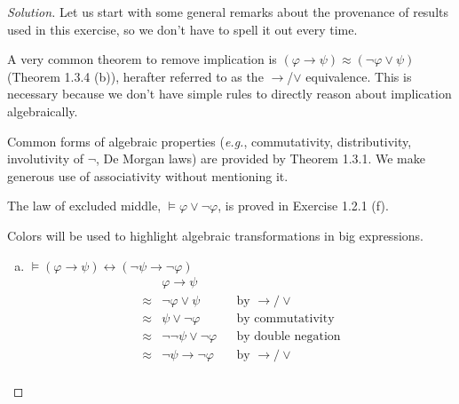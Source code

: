 \documentclass[letter]{article}
\theoremstyle{definition}
\newenvironment{solution}
{\begin{proof}[Solution]}
	{\end{proof}}
\renewcommand{\phi}{\varphi}
\begin{document}
\begin{solution}
\newcommand*\tolor{{$\to$/$\lor$}}
\newcommand*\colop[2]{\mathbin{\color{#1}#2}} %
%
Let us start with some general remarks about the provenance of results used in
this exercise, so we don't have to spell it out every time.

A very common theorem to remove implication is
$(\phi \to \psi) \approx (\neg\phi \lor \psi)$
(Theorem 1.3.4 (b)), herafter referred to as the \tolor{} equivalence.
This is necessary because we don't have simple rules to directly reason about
implication algebraically.

Common forms of algebraic properties (\textit{e.g.}, commutativity,
distributivity, involutivity of $\neg$, De Morgan laws) are provided by
Theorem 1.3.1. We make generous use of associativity without mentioning it.

The law of excluded middle, $\models \phi \lor \neg \phi$,
is proved in Exercise 1.2.1 (f).

Colors will be used to highlight algebraic transformations in big expressions.

\begin{enumerate}[(a)]
  \item $\models (\phi \to \psi) \leftrightarrow (\neg \psi \to \neg \phi)$
\begin{align*}
  & \phi \to \psi && \\
\approx{} & \neg \phi \lor \psi     && \text{by \tolor{}} \\
\approx{} & \psi \lor \neg \phi     && \text{by commutativity} \\
\approx{} & \neg \neg \psi \lor \neg \phi  && \text{by double negation} \\
\approx{} & \neg \psi \to \neg \phi && \text{by \tolor{}} \\
\end{align*}


\end{enumerate}
\end{solution}
\end{document}

